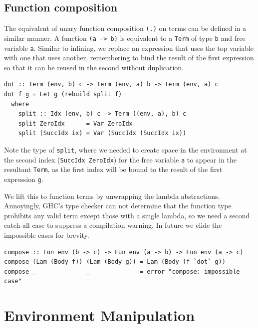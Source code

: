 
\subsection{Function composition}
\label{sec:function_composition}

The equivalent of unary function composition \texttt{(.)} on terms can be
defined in a similar manner. A function \lstinline[style=inline]{(a -> b)} is
equivalent to a \texttt{Term} of type \texttt{b} and free variable \texttt{a}.
Similar to inlining, we replace an expression that uses the top variable with
one that uses another, remembering to bind the result of the first expression so
that it can be reused in the second without duplication.
%
\begin{lstlisting}[style=haskell]
dot :: Term (env, b) c -> Term (env, a) b -> Term (env, a) c
dot f g = Let g (rebuild split f)
  where
    split :: Idx (env, b) c -> Term ((env, a), b) c
    split ZeroIdx      = Var ZeroIdx
    split (SuccIdx ix) = Var (SuccIdx (SuccIdx ix))
\end{lstlisting}
%
Note the type of \texttt{split}, where we needed to create space in the
environment at the second index (\texttt{SuccIdx ZeroIdx}) for the free variable
\texttt{a} to appear in the resultant \texttt{Term}, as the first index will be
bound to the result of the first expression \texttt{g}.

We lift this to function terms by unwrapping the lambda abstractions.
Annoyingly, GHC's type checker can not determine that the function type
prohibits any valid term except those with a single lambda, so we need a second
catch-all case to suppress a compilation warning. In future we elide the
impossible cases for brevity.
%
\begin{lstlisting}[style=haskell,firstnumber=last,caption={A simultaneous substitution to compose unary function terms}]
compose :: Fun env (b -> c) -> Fun env (a -> b) -> Fun env (a -> c)
compose (Lam (Body f)) (Lam (Body g)) = Lam (Body (f `dot` g))
compose _              _              = error "compose: impossible case"
\end{lstlisting}


\section{Environment Manipulation}
\label{sec:environment_manipulation}

